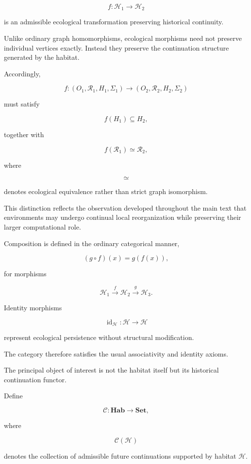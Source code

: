 \documentclass[12pt,oneside]{article}
\theoremstyle{remark}
\begin{document}
\[
f:\mathcal{H}_1
\longrightarrow
\mathcal{H}_2
\]

is an admissible ecological transformation preserving historical continuity.

Unlike ordinary graph homomorphisms, ecological morphisms need not preserve
individual vertices exactly. Instead they preserve the continuation structure
generated by the habitat.

Accordingly,

\[
f
:
(O_1,\mathcal{R}_1,H_1,\Sigma_1)
\rightarrow
(O_2,\mathcal{R}_2,H_2,\Sigma_2)
\]

must satisfy

\[
f(H_1)
\subseteq
H_2,
\]

together with

\[
f(\mathcal{R}_1)
\simeq
\mathcal{R}_2,
\]

where

\[
\simeq
\]

denotes ecological equivalence rather than strict graph isomorphism.

This distinction reflects the observation developed throughout the main text
that environments may undergo continual local reorganization while preserving
their larger computational role.

Composition is defined in the ordinary categorical manner,

\[
(g\circ f)
(x)
=
g(f(x)),
\]

for morphisms

\[
\mathcal{H}_1
\xrightarrow{f}
\mathcal{H}_2
\xrightarrow{g}
\mathcal{H}_3.
\]

Identity morphisms

\[
\operatorname{id}_{\mathcal H}
:
\mathcal H
\rightarrow
\mathcal H
\]

represent ecological persistence without structural modification.

The category therefore satisfies the usual associativity and identity axioms.

The principal object of interest is not the habitat itself but its historical
continuation functor.

Define

\[
\mathcal{C}
:
\mathbf{Hab}
\rightarrow
\mathbf{Set},
\]

where

\[
\mathcal{C}(\mathcal H)
\]

denotes the collection of admissible future continuations supported by habitat
\(\mathcal H\).
\end{document}
